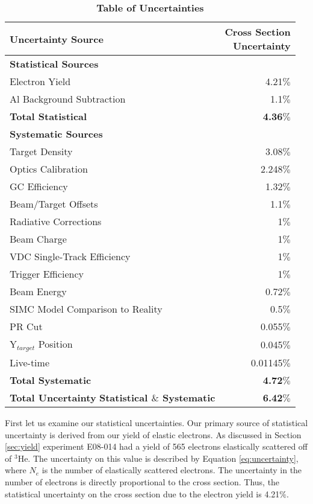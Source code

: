 \begin{table}[!h]
\centering
\begin{tabular}{|l | r |}
\hline
\textbf{Uncertainty Source} & \makecell{\textbf{Cross Section}\\ \textbf{Uncertainty}} \\
\hline
\textbf{Statistical Sources} &  \\ 
\hline
Electron Yield & 4.21$\%$\\
Al Background Subtraction & 1.1$\%$\\
\textbf{Total Statistical} &  \textbf{4.36$\%$}\\
\hline
\textbf{Systematic Sources} &  \\
\hline
Target Density & 3.08$\%$\\
Optics Calibration & 2.248$\%$\\
GC Efficiency & 1.32$\%$\\
Beam/Target Offsets & 1.1$\%$\\
Radiative Corrections & 1$\%$\\
Beam Charge & 1$\%$\\
VDC Single-Track Efficiency & 1$\%$\\
Trigger Efficiency & 1$\%$\\
Beam Energy & 0.72$\%$\\
SIMC Model Comparison to Reality & 0.5$\%$\\
PR Cut & 0.055$\%$\\ 
Y$_{target}$ Position & 0.045$\%$\\
Live-time & 0.01145$\%$\\
\textbf{Total Systematic} &  \textbf{4.72$\%$}\\
\hline
\makecell{\textbf{Total Uncertainty}\\ \textbf{Statistical $\&$ Systematic}} &  \textbf{6.42$\%$}\\
\hline
\end{tabular}
\caption[Table of Uncertainties]{{\bf{Table of Uncertainties}} }
\label{tab:uncertainty}
\end{table}

First let us examine our statistical uncertainties. Our primary source of statistical uncertainty is derived from our yield of elastic electrons. As discussed in Section \ref{sec:yield} experiment E08-014 had a yield of 565 electrons elastically scattered off of $^3$He. The uncertainty on this value is described by Equation \ref{eq:uncertainty}, where $N_e$ is the number of elastically scattered electrons. The uncertainty in the number of electrons is directly proportional to the cross section. Thus, the statistical uncertainty on the cross section due to the electron yield is 4.21$\%$.


